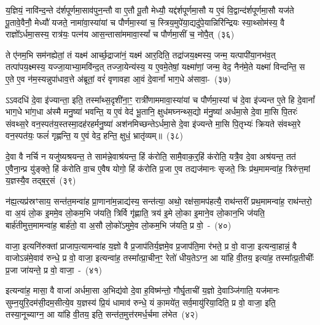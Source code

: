य॒ज्ञियं॒ नावि॑न्द॒न्ते द॑र्\mbox{}शपूर्णमा॒साव॑पुन॒न्तौ वा ए॒तौ पू॒तौ मेध्यौ॒ यद्द॑र्\mbox{}श\-पूर्ण\-मा॒सौ य ए॒वं वि॒द्वान्द॑र्\mbox{}शपूर्णमा॒सौ यज॑ते पू॒तावे॒वैनौ॒ मेध्यौ॑ यजते॒ नामा॑वा॒स्या॑यां च पौर्णमा॒स्यां च॒ स्त्रिय॒मुपे॑या॒द्यदु॑पे॒यान्निरि॑न्द्रियः स्या॒थ्सोम॑स्य॒ वै राज्ञो᳚\-ऽर्धमा॒सस्य॒ रात्र॑यः॒ पत्न॑य आस॒न्तासा॑ममावा॒स्यां᳚ च पौर्णमा॒सीं च॒ नोपै॒त्~(३६)

ते ए॑नम॒भि सम॑नह्येतां॒ तं यक्ष्म॑ आर्च्छ॒द्राजा॑नं॒ यक्ष्म॑ आर॒दिति॒ तद्रा॑जय॒क्ष्मस्य॒ जन्म॒ यत्पापी॑या॒नभ॑व॒त् त\-त्पा॑पय॒क्ष्मस्य॒ यज्जा॒याभ्या॒मवि॑न्द॒त् तज्जा॒येन्य॑स्य॒ य ए॒वमे॒तेषां॒ यक्ष्मा॑णां॒ जन्म॒ वेद॒ नैन॑मे॒ते यक्ष्मा॑ विन्दन्ति॒ स ए॒ते ए॒व न॑म॒स्यन्नुपा॑धाव॒त्ते अ॑ब्रूतां॒ वरं॑ वृणावहा आ॒वं दे॒वानां᳚ भाग॒धे अ॑सावा॒-~(३७)

ऽ\-ऽवदधि॑ दे॒वा इ॑ज्यान्ता॒ इति॒ तस्मा᳚थ्स॒दृशी॑ना॒ꣳ॒ रात्री॑णाममावा॒स्या॑यां च पौर्णमा॒स्यां च॑ दे॒वा इ॑ज्यन्त ए॒ते हि दे॒वानां᳚ भाग॒धे भा॑ग॒धा अ॑स्मै मनु॒ष्या॑ भवन्ति॒ य ए॒वं वेद॑ भू॒तानि॒ क्षुध॑मघ्नन्थ्स॒द्यो म॑नु॒ष्या॑ अर्धमा॒से दे॒वा मा॒सि पि॒तरः॑ संवथ्स॒रे वन॒स्पत॑य॒स्तस्मा॒दह॑रहर्मनु॒ष्या॑ अश॑नमिच्छन्ते\-ऽर्धमा॒से दे॒वा इ॑ज्यन्ते मा॒सि पि॒तृभ्यः॑ क्रियते संवथ्स॒रे वन॒स्पत॑यः॒ फलं॑ गृह्णन्ति॒ य ए॒वं वेद॒ हन्ति॒ क्षुधं॒ भ्रातृ॑व्यम्॥~(३८)

{\anuvakamend[{प॒श्य॒ति॒ ताभ्या॒मह॑रैदसाव॒ फलꣳ॑ स॒प्त च॑}]}%

दे॒वा वै नर्चि न यजु॑ष्यश्रयन्त॒ ते साम॑न्ने॒वाश्र॑यन्त॒ हिं क॑रोति॒ सामै॒वाक॒र्॒\mbox{}हिं क॑रोति॒ यत्रै॒व दे॒वा अश्र॑यन्त॒ तत॑ ए॒वैना॒न्प्र यु॑ङ्क्ते॒ हिं क॑रोति वा॒च ए॒वैष योगो॒ हिं क॑रोति प्र॒जा ए॒व तद्यज॑मानः सृजते॒ त्रिः प्र॑थ॒मामन्वा॑ह॒ त्रिरु॑त्त॒मां य॒ज्ञस्यै॒व तद्ब॒र्॒\mbox{}सं~(३९)

न॑ह्य॒त्यप्र॑स्रꣳसाय॒ सन्त॑त॒मन्वा॑ह प्रा॒णाना॑म॒न्नाद्य॑स्य॒ सन्त॑त्या॒ अथो॒ रक्ष॑सा॒मप॑हत्यै॒ राथ॑न्तरीं प्रथ॒मामन्वा॑ह॒ राथ॑न्तरो॒ वा अ॒यं लो॒क इ॒ममे॒व लो॒कम॒भि ज॑यति॒ त्रिर्वि गृ॑ह्णाति॒ त्रय॑ इ॒मे लो॒का इ॒माने॒व लो॒कान॒भि ज॑यति॒ बार्\mbox{}ह॑तीमुत्त॒मामन्वा॑ह॒ बार्\mbox{}ह॑तो॒ वा अ॒सौ लो॒को॑\-ऽमुमे॒व लो॒कम॒भि ज॑यति॒ प्र वो॒~-~(४०)

वाजा॒ इत्यनि॑रुक्तां प्राजाप॒त्यामन्वा॑ह य॒ज्ञो वै प्र॒जा\-प॑तिर्य॒ज्ञमे॒व प्र॒जा\-प॑ति॒मा र॑भते॒ प्र वो॒ वाजा॒ इत्यन्वा॒हान्नं॒ वै वाजो\-ऽन्न॑मे॒वाव॑ रुन्धे॒ प्र वो॒ वाजा॒ इत्यन्वा॑ह॒ तस्मा᳚त्प्रा॒चीन॒ꣳ॒ रेतो॑ धीय॒ते\-ऽग्न॒ आ या॑हि वी॒तय॒ इत्या॑ह॒ तस्मा᳚त्प्र॒तीचीः᳚ प्र॒जा जा॑यन्ते॒ प्र वो॒ वाजा॒~-~(४१)

इत्यन्वा॑ह॒ मासा॒ वै वाजा॑ अर्धमा॒सा अ॒भिद्य॑वो दे॒वा ह॒विष्म॑न्तो॒ गौर्घृ॒ताची॑ य॒ज्ञो दे॒वाञ्जि॑गाति॒ यज॑मानः सुम्न॒युरि॒दम॑सी॒दम॒सीत्ये॒व य॒ज्ञस्य॑ प्रि॒यं धामाव॑ रुन्धे॒ यं का॒मये॑त॒ सर्व॒मायु॑रिया॒दिति॒ प्र वो॒ वाजा॒ इति॒ तस्या॒नूच्याग्न॒ आ या॑हि वी॒तय॒ इति॒ सन्त॑त॒मुत्त॑रमर्ध॒र्चमा ल॑भेत~(४२)


